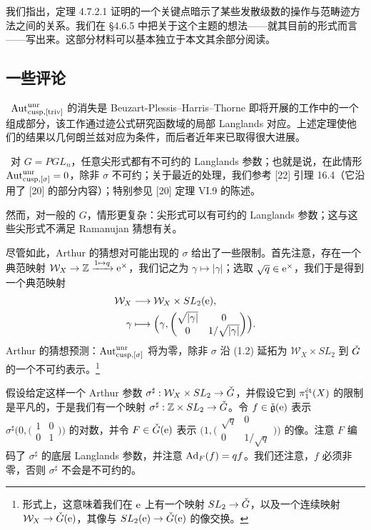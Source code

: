\begin{remark}
我们指出，定理 4.7.2.1 证明的一个关键点暗示了某些发散级数的操作与范畴迹方法之间的关系。我们在 §4.6.5 中把关于这个主题的想法——就其目前的形式而言——写出来。这部分材料可以基本独立于本文其余部分阅读。
\end{remark}

\subsection{一些评论}

\ $\Aut^{\unr}_{\cusp,[\triv]}$ 的消失是 Beuzart-Plessis--Harris--Thorne 即将开展的工作中的一个组成部分，该工作通过迹公式研究函数域的局部 Langlands 对应。上述定理使他们的结果以几何朗兰兹对应为条件，而后者近年来已取得很大进展。

\ 对 $G = PGL_n$，任意尖形式都有不可约的 Langlands 参数；也就是说，在此情形 $\Aut^{\unr}_{\cusp,[\sigma]} = 0$，除非 $\sigma$ 不可约；关于最近的处理，我们参考 [22] 引理 16.4（它沿用了 [20] 的部分内容）；特别参见 [20] 定理 VI.9 的陈述。

然而，对一般的 $G$，情形更复杂：尖形式可以有可约的 Langlands 参数；这与这些尖形式不满足 Ramanujan 猜想有关。

尽管如此，Arthur 的猜想对可能出现的 $\sigma$ 给出了一些限制。首先注意，存在一个典范映射 $\mathcal{W}_X \to \ZZ \xrightarrow{1 \mapsto q} \e^\times$，我们记之为 $\gamma \mapsto |\gamma|$；选取 $\sqrt{q} \in \e^\times$，我们于是得到一个典范映射
\begin{equation}
  \begin{aligned}
    \mathcal{W}_X &\longrightarrow \mathcal{W}_X \times SL_2(\e),\\
    \gamma &\longmapsto \Bigl(\gamma, \begin{pmatrix} \sqrt{|\gamma|} & 0 \\ 0 & 1/\sqrt{|\gamma|} \end{pmatrix}\Bigr).
  \end{aligned}
\end{equation}
Arthur 的猜想预测：$\Aut^{\unr}_{\cusp,[\sigma]}$ 将为零，除非 $\sigma$ 沿 (1.2) 延拓为 $\mathcal{W}_X \times SL_2$ 到 $\bG$ 的一个不可约表示。\footnote{形式上，这意味着我们在 $\e$ 上有一个映射 $SL_2 \to \bG$，以及一个连续映射 $\mathcal{W}_X \to \bG(\e)$，其像与 $SL_2(\e) \to \bG(\e)$ 的像交换。}

\pnum{}假设给定这样一个 Arthur 参数 $\sigma^\sharp: \mathcal{W}_X \times SL_2 \to \bG$，并假设它到 $\pi_1^{\et}(X)$ 的限制是平凡的，于是我们有一个映射 $\sigma^\sharp: \ZZ \times SL_2 \to \bG$。令 $f \in \bg(\e)$ 表示 $\sigma^\sharp\bigl(0, \bigl(\begin{smallmatrix} 1 & 0 \\ 0 & 1 \end{smallmatrix}\bigr)\bigr)$ 的对数，并令 $F \in \bG(\e)$ 表示 $\bigl(1, \bigl(\begin{smallmatrix} \sqrt{q} & 0 \\ 0 & 1/\sqrt{q} \end{smallmatrix}\bigr)\bigr)$ 的像。注意 $F$ 编码了 $\sigma^\sharp$ 的底层 Langlands 参数，并注意 $\Ad_F(f) = qf$。我们还注意，$f$ 必须非零，否则 $\sigma^\sharp$ 不会是不可约的。

